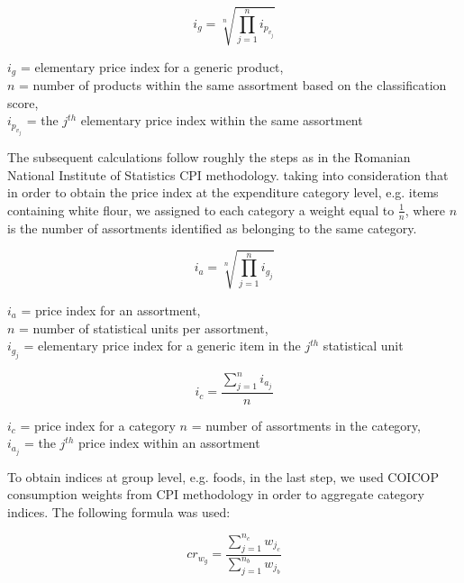 \documentclass[]{article}
\begin{document}
\begin{equation}\label{eq:3}
i_{g} = \sqrt[n]{\prod_{j=1}^{n} i_{p_{v_{j}}}}
\end{equation}

\begin{center}
	$i_{g}$ = elementary price index for a generic product, \\
	$n$ = number of products within the same assortment based on the classification score, \\
	$i_{p_{v_{j}}}$ = the $j^{th}$ elementary price index within the same assortment
\end{center}

The subsequent calculations follow roughly the steps as in the Romanian National Institute of Statistics CPI methodology\cite{cpi}. taking into consideration that in order to obtain the price index at the expenditure category level, e.g. items containing white flour, we assigned to each category a weight equal to $\frac{1}{n}$,
where $n$ is the number of assortments identified as belonging to the same category. 

\begin{equation}\label{eq:4}
i_{a} = \sqrt[n]{\prod_{j=1}^n i_{g_{j}}}
\end{equation}

\begin{center}
	$i_{a}$ = price index for an assortment, \\
	$n$ = number of statistical units per assortment, \\
	$i_{g_{j}}$ = elementary price index for a generic item in the $j^{th}$ statistical unit
\end{center}


\begin{equation}\label{eq:5}
i_{c} = \frac{\sum_{j=1}^n i_{a_{j}}}{n}
\end{equation}

\begin{center}
	$i_{c}$ = price index for a category
	$n$ = number of assortments in the category, \\
	$i_{a_{j}}$ = the $j^{th}$ price index within an assortment
\end{center}

To obtain indices at group level, e.g. foods, in the last step, we used COICOP consumption weights from CPI methodology in order to aggregate category indices.  The following formula was used:


\begin{equation}\label{eq:6}
cr_{w_{g}} = \frac{\sum_{j=1}^{n_{c}}{w_{j_{c}}}}{\sum_{j=1}^{n_{b}}{w_{j_{b}}}}
\end{equation}
\end{document}
